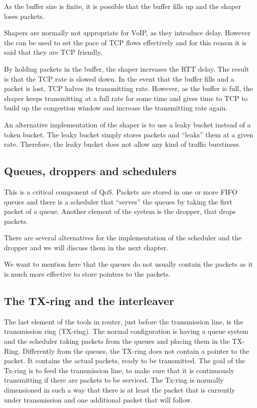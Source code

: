 As the buffer size is finite, it is possible that the buffer fills up and the shaper loses packets.

Shapers are normally not appropriate for VoIP, as they introduce delay.
However the can be used to set the pace of TCP flows effectively and for this reason it is said that they are TCP friendly.

By holding packets in the buffer, the shaper increases the RTT delay.
The result is that the TCP rate is slowed down.
In the event that the buffer fills and a packet is lost, TCP halves its transmitting rate.
However, as the buffer is full, the shaper keeps transmitting at a full rate for some time and gives time to TCP to build up the congestion window and increase the transmitting rate again.

An alternative implementation of the shaper is to use a leaky bucket instead of a token bucket.
The leaky bucket simply stores packets and ``leaks'' them at a given rate.
Therefore, the leaky bucket does not allow any kind of traffic burstiness.

\subsection{Queues, droppers and schedulers}

This is a critical component of QoS.
Packets are stored in one or more FIFO queues and there is a scheduler that ``serves'' the queues by taking the first packet of a queue.
Another element of the system is the dropper, that drops packets.

There are several alternatives for the implementation of the scheduler and the dropper and we will discuss them in the next chapter.

We want to mention here that the queues do not usually contain the packets as it is much more effective to store pointers to the packets.

\subsection{The TX-ring and the interleaver}
The last element of the tools in router, just before the transmission line, is the transmission ring (TX-ring).
The normal configuration is having a queue system and the scheduler taking packets from the queues and placing them in the TX-Ring.
Differently from the queues, the TX-ring does not contain a pointer to the packet.
It contains the actual packets, ready to be transmitted.
The goal of the Tx-ring is to feed the transmission line, to make sure that it is continuously transmitting if there are packets to be serviced.
The Tx-ring is normally dimensioned in such a way that there is at least the packet that is currently under transmission and one additional packet that will follow.


